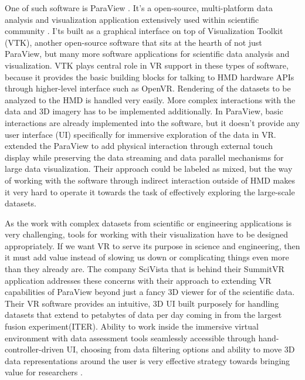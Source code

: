 One of such software is ParaView \citep{paraview2005}. It's a open-source, multi-platform data analysis and visualization application extensively used within scientific community \citep{marionPCLParaViewConnecting2012,ahrensPetascaleVisualizationApproaches2008}. I'ts built as a graphical interface on top of Visualization Toolkit (VTK), another open-source software that sits at the hearth of not just ParaView, but many more software applications for scientific data analysis and visualization. VTK plays central role in VR support in these types of software, because it provides the basic building blocks for talking to HMD hardware APIs through higher-level interface such as OpenVR. Rendering of the datasets to be analyzed to the HMD is handled very easily. More complex interactions with the data and 3D imagery has to be implemented additionally. In ParaView, basic interactions are already implemented into the software, but it doesn't provide any user interface (UI) specifically for immersive exploration of the data in VR. \cite{shettyImmersiveParaViewCommunitybased2011} extended the ParaView to add physical interaction through external touch display while preserving the data streaming and data parallel mechanisms for large data visualization. Their approach could be labeled as mixed, but the way of working with the software through indirect interaction outside of HMD makes it very hard to operate it towards the task of effectively exploring the large-scale datasets. 

As the work with complex datasets from scientific or engineering applications is very challenging, tools for working with their visualization have to be designed appropriately. If we want VR to serve its purpose in science and engineering, then it must add value instead of slowing us down or complicating things even more than they already are. The company SciVista that is behind their SummitVR application addresses these concerns with their approach to extending VR capabilities of ParaView beyond just a fancy 3D viewer for of the scientific data. Their VR software provides an intuitive, 3D UI built purposely for handling datasets that extend to petabytes of data per day coming in from the largest fusion experiment(ITER). Ability to work inside the immersive virtual environment with data assessment tools seamlessly accessible through hand-controller-driven UI, choosing from data filtering options and ability to move 3D data representations around the user is very effective strategy towards bringing value for researchers \citep{summitvr}.

